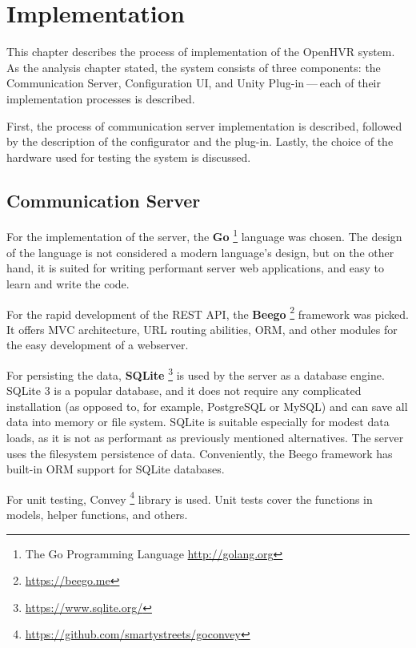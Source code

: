 \chapter{Implementation}

This chapter describes the process of implementation of the OpenHVR system.
As the analysis chapter stated, the system consists of three components: the
Communication Server, Configuration UI, and Unity Plug-in — each of their
implementation processes is described.


First, the process of communication server implementation is described,
followed by the description of the configurator and the plug-in. Lastly, the choice
of the hardware used for testing the system is discussed.


\hypertarget{x-communication-server}{\section{Communication Server}}
For the implementation of the server, the
\textbf{Go} \footnote{The Go Programming Language \href{http://golang.org}{http://golang.org}} language was
chosen. The design of the language is not considered a modern
language’s design, but on the other hand, it is
suited for writing performant server web applications, and easy
to learn and write the code. \cite{gogbu}


For the rapid development of the REST API, the \textbf{Beego} \footnote{\href{https://beego.me}{https://beego.me}}
framework was picked. It offers MVC architecture, URL routing abilities, ORM,
and other modules for the easy development of a webserver.


For persisting the data, \textbf{SQLite} \footnote{\href{https://www.sqlite.org/}{https://www.sqlite.org/}}
is used by the server as a database engine. SQLite 3 is
a popular database, and it does not require any complicated installation
(as opposed to, for example, PostgreSQL or MySQL) and can save all data into
memory or file system. SQLite is suitable especially for modest data loads, as
it is not as performant as previously mentioned alternatives. The server uses the
filesystem persistence of data. Conveniently, the Beego framework has built-in
ORM support for SQLite databases.


For unit testing, Convey \footnote{\href{https://github.com/smartystreets/goconvey}{https://github.com/smartystreets/goconvey}}
library is used. Unit tests cover the functions in models, helper functions,
and others.


